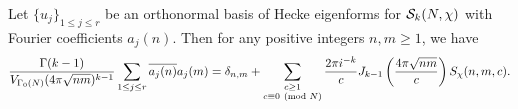     \begin{theorem}
      Let $\{u_{j}\}_{1 \le j \le r}$ be an orthonormal basis of Hecke eigenforms for $\mathcal{S}_{k}(N,\chi)$ with Fourier coefficients $a_{j}(n)$. Then for any positive integers $n,m \ge 1$, we have
      \[
        \frac{\Gamma(k-1)}{V_{\Gamma_{0}(N)}(4\pi\sqrt{nm})^{k-1}}\sum_{1 \le j \le r}\overline{a_{j}(n)}a_{j}(m) = \delta_{n,m}+\sum_{\substack{c \ge 1 \\ c \equiv 0 \ \left(\text{mod }N\right)}}\frac{2\pi i^{-k}}{c}J_{k-1}\left(\frac{4\pi\sqrt{nm}}{c}\right)S_{\chi}(n,m,c).
      \]
    \end{theorem}